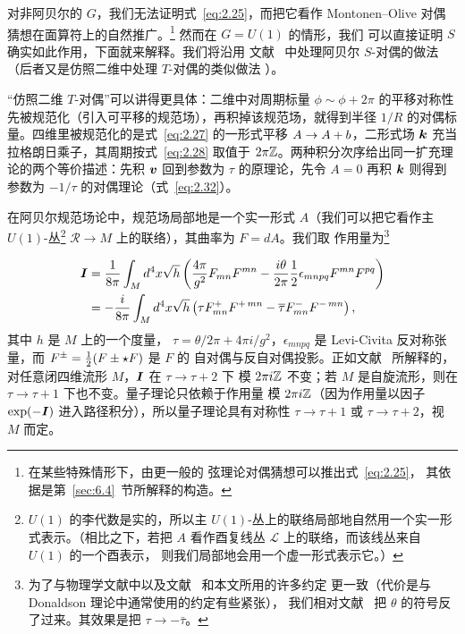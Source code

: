 \bigskip{}

对非阿贝尔的 $G$，我们无法证明式~\eqref{eq:2.25}，而把它看作
Montonen–Olive 对偶猜想在面算符上的自然推广。\footnote{在某些特殊情形下，由更一般的
弦理论对偶猜想可以推出式~\eqref{eq:2.25}，
其依据是第~\ref{sec:6.4}~节所解释的构造。} 然而在 $G=U(1)$ 的情形，我们
可以直接证明 $S$ 确实如此作用，下面就来解释。我们将沿用
文献~\cite{ref43} 中处理阿贝尔 $S$-对偶的做法
（后者又是仿照二维中处理 $T$-对偶的类似做法
%
%
\cite{ref44,ref45}）。

\begin{yizhu}[物理图像补充]
“仿照二维 $T$-对偶”可以讲得更具体：二维中对周期标量 $\phi\sim\phi+2\pi$ 的平移对称性先被规范化（引入可平移的规范场），再积掉该规范场，就得到半径 $1/R$ 的对偶标量。四维里被规范化的是式~\eqref{eq:2.27} 的一形式平移 $A\to A+b$，二形式场 $\bm{k}$ 充当拉格朗日乘子，其周期按式~\eqref{eq:2.28} 取值于 $2\pi{\mathbb{Z}}$。两种积分次序给出同一扩充理论的两个等价描述：先积 $\bm{v}$ 回到参数为 $\tau$ 的原理论，先令 $A=0$ 再积 $\bm{k}$ 则得到参数为 $-1/\tau$ 的对偶理论（式~\eqref{eq:2.32}）。
\end{yizhu}


在阿贝尔规范场论中，规范场局部地是一个实一形式
$A$（我们可以把它看作主
$U(1)$-丛\footnote{$U(1)$ 的李代数是实的，所以主
$U(1)$-丛上的联络局部地自然用一个实一形式表示。（相比之下，若把
$A$ 看作酉复线丛 ${\mathcal L}$ 上的联络，而该线丛来自 $U(1)$ 的一个酉表示，
则我们局部地会用一个虚一形式表示它。）}
${\mathcal R}\to M$ 上的联络），其曲率为 $F=dA$。我们取
作用量为\footnote{为了与物理学文献中以及文献~\cite{ref8} 和本文所用的许多约定
更一致（代价是与 Donaldson 理论中通常使用的约定有些紧张），
我们相对文献~\cite{ref43} 把 $\theta$ 的符号反了过来。其效果是把 $\tau\to -\bar\tau$。}

\setcounter{equation}{25}
\begin{equation}\label{eq:2.26}
  \begin{aligned}\bm{I}&={1\over 8\pi}\int_Md^4x\sqrt
h\left({4\pi\over g^2}F_{mn}F^{mn}-{i\theta\over 2\pi}{1\over
2}\epsilon_{mnpq}F^{mn}F^{pq}\right)\\ &=-{i\over
8\pi}\int_Md^4x\sqrt h\left(\tau F^+_{mn}F^{+\,mn}-\overline\tau
F_{mn}^-F^{-\,mn}\right),\end{aligned}
\end{equation}
 其中 $h$ 是 $M$ 上的一个度量，
$\tau=\theta/2\pi+4\pi i/g^2$，$\epsilon_{mnpq}$ 是 Levi-Civita
反对称张量，而 $F^\pm={1\over 2}(F\pm \star F)$ 是 $F$ 的
自对偶与反自对偶投影。正如文献~\cite{ref43} 所解释的，对任意闭四维流形 $M$，$\bm{I}$ 在 $\tau\to\tau+2$ 下
模 $2\pi i{\mathbb{Z}}$ 不变；若 $M$ 是自旋流形，则在 $\tau\to\tau+1$ 下也不变。量子理论只依赖于作用量
模 $2\pi i{\mathbb{Z}}$（因为作用量以因子
$\exp(-\bm{I})$ 进入路径积分），所以量子理论具有对称性
$\tau\to\tau+1$ 或 $\tau\to\tau+2$，视 $M$ 而定。




